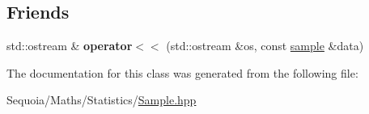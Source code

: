 \subsection*{Friends}
\begin{DoxyCompactItemize}
\item 
\mbox{\label{classsequoia_1_1maths_1_1statistics_1_1sample_3_01_t_00_010_01_4_ab83ad5239acca8b74ecef294271ab010}} 
std\+::ostream \& {\bfseries operator$<$$<$} (std\+::ostream \&os, const \mbox{\hyperlink{classsequoia_1_1maths_1_1statistics_1_1sample}{sample}} \&data)
\end{DoxyCompactItemize}


The documentation for this class was generated from the following file\+:\begin{DoxyCompactItemize}
\item 
Sequoia/\+Maths/\+Statistics/\mbox{\hyperlink{_sample_8hpp}{Sample.\+hpp}}\end{DoxyCompactItemize}
